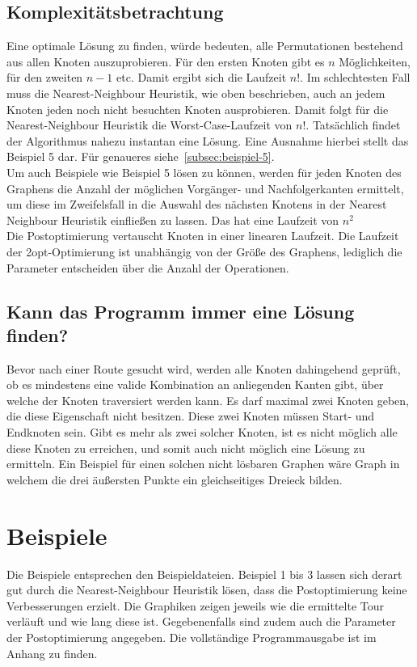 \subsection{Komplexitätsbetrachtung}\label{subsec:komplexitatsbetrachtung}
Eine optimale Lösung zu finden, würde bedeuten, alle Permutationen bestehend aus allen Knoten auszuprobieren.
Für den ersten Knoten gibt es $n$ Möglichkeiten, für den zweiten $n - 1$ etc.
Damit ergibt sich die Laufzeit $n!$.
Im schlechtesten Fall muss die Nearest-Neighbour Heuristik, wie oben beschrieben, auch an jedem Knoten jeden noch nicht besuchten Knoten ausprobieren.
Damit folgt für die Nearest-Neighbour Heuristik die Worst-Case-Laufzeit von $n!$.
Tatsächlich findet der Algorithmus nahezu instantan eine Lösung.
Eine Ausnahme hierbei stellt das Beispiel 5 dar.
Für genaueres siehe~\ref{subsec:beispiel-5}. \\
Um auch Beispiele wie Beispiel 5 lösen zu können, werden für jeden Knoten des Graphens die Anzahl der möglichen
Vorgänger- und Nachfolgerkanten ermittelt, um diese im Zweifelsfall in die Auswahl des nächsten Knotens
in der Nearest Neighbour Heuristik einflie{\ss}en zu lassen.
Das hat eine Laufzeit von $n^2$ \\
Die Postoptimierung vertauscht Knoten in einer linearen Laufzeit.
Die Laufzeit der 2opt-Optimierung ist unabhängig von der Grö{\ss}e des Graphens, lediglich die Parameter entscheiden über die
Anzahl der Operationen.

\subsection{Kann das Programm immer eine Lösung finden?}\label{subsec:losbarkeit}
Bevor nach einer Route gesucht wird, werden alle Knoten dahingehend geprüft, ob es mindestens eine valide Kombination
an anliegenden Kanten gibt, über welche der Knoten traversiert werden kann.
Es darf maximal zwei Knoten geben, die diese Eigenschaft nicht besitzen.
Diese zwei Knoten müssen Start- und Endknoten sein.
Gibt es mehr als zwei solcher Knoten, ist es nicht möglich alle diese Knoten zu erreichen, und somit auch nicht möglich
eine Lösung zu ermitteln.
Ein Beispiel für einen solchen nicht lösbaren Graphen wäre Graph in welchem
die drei äu{\ss}ersten Punkte ein gleichseitiges Dreieck bilden.


\section{Beispiele}\label{sec:beispiele}
Die Beispiele entsprechen den Beispieldateien.
Beispiel 1 bis 3 lassen sich derart gut durch die Nearest-Neighbour Heuristik lösen, dass die Postoptimierung keine Verbesserungen erzielt.
Die Graphiken zeigen jeweils wie die ermittelte Tour verläuft und wie lang diese ist.
Gegebenenfalls sind zudem auch die Parameter der Postoptimierung angegeben.
Die vollständige Programmausgabe ist im Anhang zu finden.

